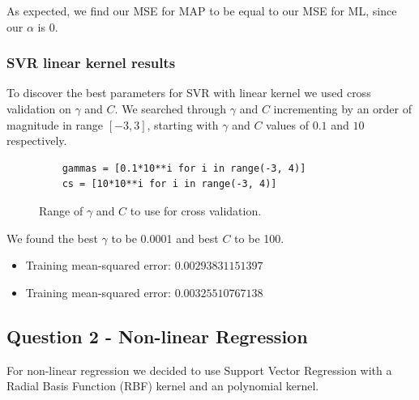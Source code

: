 \documentclass[12pt]{article}
\begin{document}
\noindent As expected, we find our MSE for MAP to be equal to our MSE for ML, since our $\alpha$ is $0$.


\subsubsection{SVR linear kernel results}
\label{section:SVR linear kernel results}

To discover the best parameters for SVR with linear kernel we used cross validation on $\gamma$ and $C$. We searched through $\gamma$ and $C$ incrementing by an order of magnitude in range $[-3, 3]$, starting with $\gamma$ and $C$ values of $0.1$ and $10$ respectively.

\begin{figure}[H]
	\begin{lstlisting}
	gammas = [0.1*10**i for i in range(-3, 4)]
	cs = [10*10**i for i in range(-3, 4)]
	\end{lstlisting}
	\caption{Range of $\gamma$ and $C$ to use for cross validation.}
	\label{fig:gamme_c}
\end{figure}

\noindent We found the best $\gamma$ to be 0.0001 and best $C$ to be 100.

\begin{itemize}
	\item Training mean-squared error: $0.00293831151397$
	\item Training mean-squared error: $0.00325510767138$
\end{itemize}


\newpage

\subsection{Question 2 - Non-linear Regression}

For non-linear regression we decided to use Support Vector Regression with a Radial Basis Function (RBF) kernel and an polynomial kernel. \\
\end{document}
